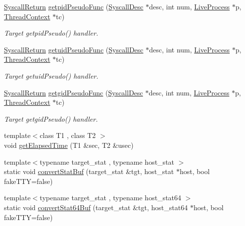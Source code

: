\begin{DoxyCompactItemize}
\hyperlink{classSyscallReturn}{SyscallReturn} \hyperlink{syscall__emul_8hh_aefdd5bd75cc1a431a02db4b4ba62adf4}{getpidPseudoFunc} (\hyperlink{classSyscallDesc}{SyscallDesc} $\ast$desc, int num, \hyperlink{classLiveProcess}{LiveProcess} $\ast$p, \hyperlink{classThreadContext}{ThreadContext} $\ast$tc)
\begin{DoxyCompactList}\small\item\em Target getpidPseudo() handler. \item\end{DoxyCompactList}\item 
\hyperlink{classSyscallReturn}{SyscallReturn} \hyperlink{syscall__emul_8hh_a4a4bc3599400554b3e122765ffaa17db}{getuidPseudoFunc} (\hyperlink{classSyscallDesc}{SyscallDesc} $\ast$desc, int num, \hyperlink{classLiveProcess}{LiveProcess} $\ast$p, \hyperlink{classThreadContext}{ThreadContext} $\ast$tc)
\begin{DoxyCompactList}\small\item\em Target getuidPseudo() handler. \item\end{DoxyCompactList}\item 
\hyperlink{classSyscallReturn}{SyscallReturn} \hyperlink{syscall__emul_8hh_aaa6dbbc64e20f7cc39483464fbdace9d}{getgidPseudoFunc} (\hyperlink{classSyscallDesc}{SyscallDesc} $\ast$desc, int num, \hyperlink{classLiveProcess}{LiveProcess} $\ast$p, \hyperlink{classThreadContext}{ThreadContext} $\ast$tc)
\begin{DoxyCompactList}\small\item\em Target getgidPseudo() handler. \item\end{DoxyCompactList}\item 
{\footnotesize template$<$class T1 , class T2 $>$ }\\void \hyperlink{syscall__emul_8hh_ae0808df4f0ff1b8912037c856ee8d5f5}{getElapsedTime} (T1 \&sec, T2 \&usec)
\item 
{\footnotesize template$<$typename target\_\-stat , typename host\_\-stat $>$ }\\static void \hyperlink{syscall__emul_8hh_a89261d6022ca29a6b473edc80acb77ad}{convertStatBuf} (target\_\-stat \&tgt, host\_\-stat $\ast$host, bool fakeTTY=false)
\item 
{\footnotesize template$<$typename target\_\-stat , typename host\_\-stat64 $>$ }\\static void \hyperlink{syscall__emul_8hh_a0bf9da6738473d5c324756b3259c57f4}{convertStat64Buf} (target\_\-stat \&tgt, host\_\-stat64 $\ast$host, bool fakeTTY=false)

\end{DoxyCompactItemize}
